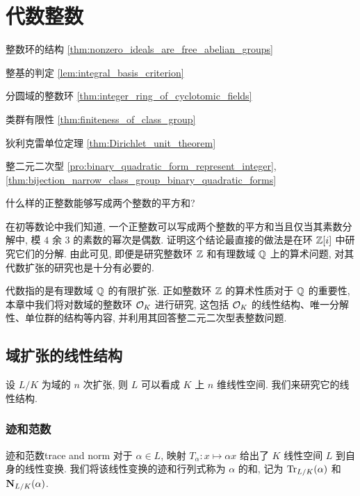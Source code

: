 \chapter{代数整数}
\begin{introduction}
\item 整数环的结构 \ref{thm:nonzero_ideals_are_free_abelian_groups}
\item 整基的判定 \ref{lem:integral_basis_criterion}
\item 分圆域的整数环 \ref{thm:integer_ring_of_cyclotomic_fields}
\item 类群有限性 \ref{thm:finiteness_of_class_group}
\item 狄利克雷单位定理 \ref{thm:Dirichlet_unit_theorem}
\item 整二元二次型 \ref{pro:binary_quadratic_form_represent_integer}, \ref{thm:bijection_narrow_class_group_binary_quadratic_forms}
\end{introduction}

\begin{question*}{}
什么样的正整数能够写成两个整数的平方和?
\end{question*}


在初等数论中我们知道, 一个正整数可以写成两个整数的平方和当且仅当其素数分解中, 模 $4$ 余 $3$ 的素数的幂次是偶数. 证明这个结论最直接的做法是在环 ${\mathbb{Z}}[i]$ 中研究它们的分解. 由此可见, 即便是研究整数环 ${\mathbb{Z}}$ 和有理数域 ${\mathbb{Q}}$ 上的算术问题, 对其代数扩张的研究也是十分有必要的.

代数指的是有理数域 ${\mathbb{Q}}$ 的有限扩张. 正如整数环 ${\mathbb{Z}}$ 的算术性质对于 ${\mathbb{Q}}$ 的重要性, 本章中我们将对数域的整数环 ${\mathcal{O}}_K$ 进行研究, 这包括 ${\mathcal{O}}_K$ 的线性结构、唯一分解性、单位群的结构等内容, 并利用其回答整二元二次型表整数问题.

\section{域扩张的线性结构}
设 $L/K$ 为域的 $n$ 次扩张, 则 $L$ 可以看成 $K$ 上 $n$ 维线性空间. 我们来研究它的线性结构.

\subsection{迹和范数}

\begin{definition}{迹和范数}{trace and norm}
对于 $\alpha\in L$, 映射 $T_\alpha:x\mapsto \alpha x$ 给出了 $K$ 线性空间 $L$ 到自身的线性变换. 我们将该线性变换的迹和行列式称为 $\alpha$ 的和, 记为 ${\mathrm{Tr}}_{L/K}(\alpha)$ 和 ${\mathbf{N}}_{L/K}(\alpha)$.
\end{definition}

